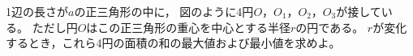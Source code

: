 \begin{problem}
1辺の長さが$a$の正三角形の中に，
図のように4円$O$，$O_1$，$O_2$，$O_3$が接している。
ただし円$O$はこの正三角形の重心を中心とする半径$r$の円である。
$r$が変化するとき，これら4円の面積の和の最大値および最小値を求めよ。
\end{problem}
